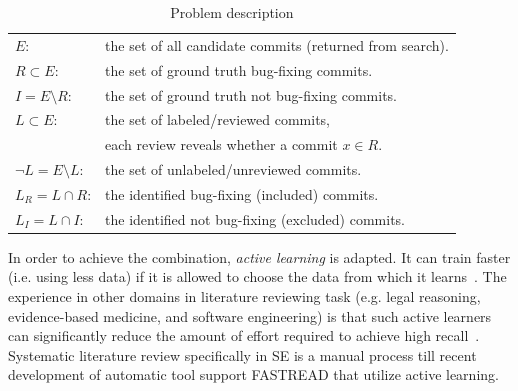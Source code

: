 \documentclass[sigconf,review, anonymous]{acmart}
\begin{document}
\begin{table}[!t]
\footnotesize
\caption{Problem description}
\vspace{-10pt}
\label{tab: problem}
\begin{tabular}{ll}
\rowcolor{gray!10} 
$E$: & the set of all candidate commits (returned from search).\\\rowcolor{gray!10} 
$R\subset E$: & the set of ground truth bug-fixing commits. \\\rowcolor{gray!10} 
$I=E\setminus R$: & the set of ground truth not bug-fixing commits.\\\rowcolor{gray!10} 
$L\subset E$: & the set of labeled/reviewed commits, \\\rowcolor{gray!10}  & each review reveals whether a commit $x\in R$.\\\rowcolor{gray!10} 
$\neg L=E\setminus L$: & the set of unlabeled/unreviewed commits.\\\rowcolor{gray!10} 
$L_R=L\cap R$: & the identified bug-fixing (included) commits.\\\rowcolor{gray!10} 
$L_I=L\cap I$: & the identified not bug-fixing (excluded) commits.
\end{tabular}
\vspace{-5mm}
\end{table}


In order to achieve the combination, {\em active learning} is adapted. It can train faster (i.e. using less  data) if it is allowed to choose the data from which it learns~\cite{settles2012active}. The experience in other domains in literature reviewing task (e.g. legal reasoning, evidence-based medicine, and software engineering) is that such active learners can significantly reduce the amount of effort required to achieve high recall~\cite{Cormack2017Navigating, Cormack2016Engineering, cormack2016scalability, Cormack2015Autonomy, Cormack2014Evaluation, Wallace2010Semi, wallace2010active, wallace2011should, wallace2012class, nguyen2015combining, Yu2018Recall}. Systematic literature review specifically in SE is a manual process till recent development of automatic tool support FASTREAD that utilize active learning. 

 
\end{document}

